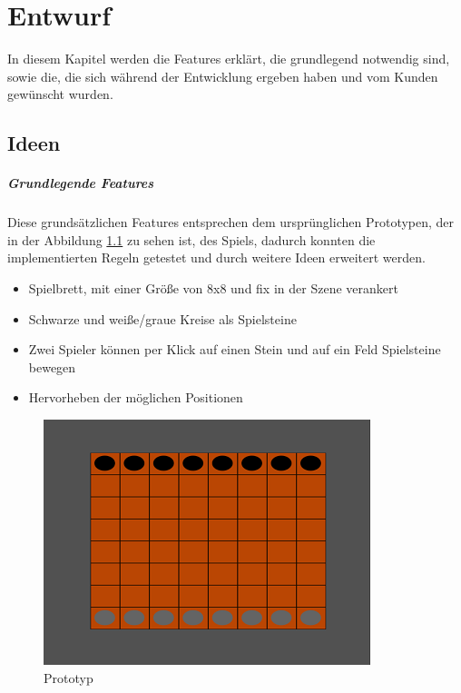 
\chapter{Entwurf}
\label{ch:Entwurf}
In diesem Kapitel werden die Features erklärt, die grundlegend notwendig sind, sowie die, die sich während der Entwicklung ergeben haben und vom Kunden gewünscht wurden.

\section{Ideen}
\label{ch:Entwurf:sec:1.Konzept}
\paragraph{Grundlegende Features}
 Diese grundsätzlichen Features entsprechen dem ursprünglichen Prototypen, der in der Abbildung \ref{fig:Prototyp} zu sehen ist, des Spiels, dadurch konnten die implementierten Regeln getestet und durch weitere Ideen erweitert werden.
 	\begin{itemize}
 		\item Spielbrett, mit einer Größe von 8x8 und fix in der Szene verankert
 		\item Schwarze und weiße/graue Kreise als Spielsteine
 		\item Zwei Spieler können per Klick auf einen Stein und auf ein Feld Spielsteine bewegen
 		\item Hervorheben der möglichen Positionen
 	\end{itemize}
\begin{figure}[h]
	\centering
	\includegraphics{img/Prototyp}
	\caption{Prototyp}
	\label{fig:Prototyp}
\end{figure}
